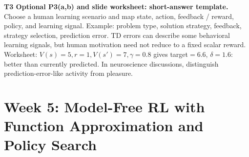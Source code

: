 \documentclass[10pt,a4paper]{article}
\newcommand{\topic}[1]{\clearpage\section{#1}}
\begin{document}
\begin{plain}\label{q:t3optional}
\textbf{T3 Optional P3(a,b) and slide worksheet: short-answer template.} Choose a human learning scenario and map state, action, feedback / reward, policy, and learning signal. Example: problem type, solution strategy, feedback, strategy selection, prediction error. TD errors can describe some behavioral learning signals, but human motivation need not reduce to a fixed scalar reward.
Worksheet: $V(s)=5,r=1,V(s')=7,\gamma=0.8$ gives target$=6.6$, $\delta=1.6$: better than currently predicted. In neuroscience discussions, distinguish prediction-error-like activity from pleasure.
\end{plain}

\topic{Week 5: Model-Free RL with Function Approximation and Policy Search}
\end{document}
